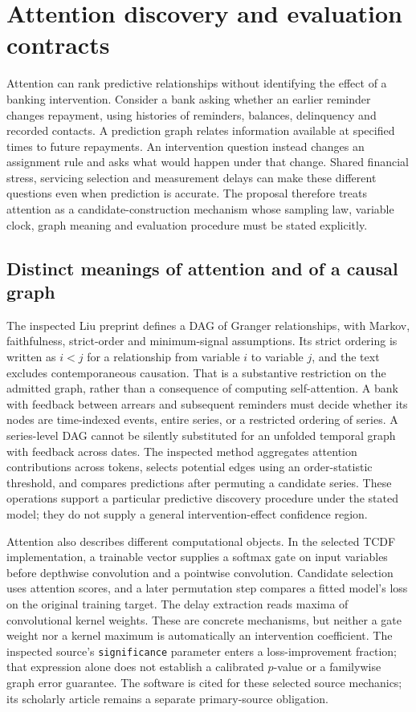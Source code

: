 \section[Attention discovery and evaluation contracts]{Attention discovery and evaluation contracts}
\label{sec:exec28-at}
Attention can rank predictive relationships without identifying the effect of a banking intervention.
Consider a bank asking whether an earlier reminder changes repayment, using histories of reminders,
balances, delinquency and recorded contacts. A prediction graph relates information available at
specified times to future repayments. An intervention question instead changes an assignment rule
and asks what would happen under that change. Shared financial stress, servicing selection and
measurement delays can make these different questions even when prediction is accurate. The
proposal therefore treats attention as a candidate-construction mechanism whose sampling law,
variable clock, graph meaning and evaluation procedure must be stated explicitly.

\subsection{Distinct meanings of attention and of a causal graph}
The inspected Liu preprint defines a DAG of Granger relationships, with Markov, faithfulness,
strict-order and minimum-signal assumptions. Its strict ordering is written as $i<j$ for a
relationship from variable $i$ to variable $j$, and the text excludes contemporaneous causation.
That is a substantive restriction on the admitted graph, rather than a consequence of computing
self-attention. A bank with feedback between arrears and subsequent reminders must decide whether
its nodes are time-indexed events, entire series, or a restricted ordering of series. A series-level
DAG cannot be silently substituted for an unfolded temporal graph with feedback across dates.
The inspected method aggregates attention contributions across tokens, selects potential edges
using an order-statistic threshold, and compares predictions after permuting a candidate series.
These operations support a particular predictive discovery procedure under the stated model;
they do not supply a general intervention-effect confidence region.~\citep{exec28_at_liu}

Attention also describes different computational objects. In the selected TCDF implementation,
a trainable vector supplies a softmax gate on input variables before depthwise convolution and a
pointwise convolution. Candidate selection uses attention scores, and a later permutation step
compares a fitted model's loss on the original training target. The delay extraction reads maxima
of convolutional kernel weights. These are concrete mechanisms, but neither a gate weight nor a
kernel maximum is automatically an intervention coefficient. The inspected source's
\texttt{significance} parameter enters a loss-improvement fraction; that expression alone does
not establish a calibrated $p$-value or a familywise graph error guarantee. The software is cited
for these selected source mechanics; its scholarly article remains a separate primary-source
obligation.~\citep{exec28_at_tcdf}

